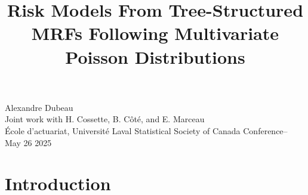 \documentclass[11pt,xcolor={dvipsnames},hyperref={pdftex,pdfpagemode=UseNone,hidelinks,pdfdisplaydoctitle=true},usepdftitle=false]{beamer}
\begin{document}
\title{Risk Models From Tree-Structured MRFs Following Multivariate Poisson Distributions}


\information
%
%
{
\Large Alexandre Dubeau\\
\smallskip \large Joint work with H. Cossette, B. Côté, and E. Marceau\\
\normalsize École d'actuariat, Université Laval}
%
{Statistical Society of Canada Conference-- May 26 2025}

\frame{\titlepage}

\section{Introduction}

\end{document}
